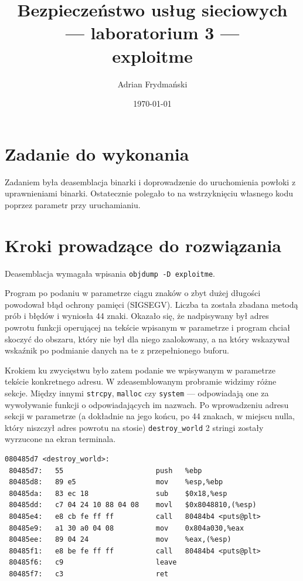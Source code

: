 \documentclass[a4paper]{article}
\title{Bezpieczeństwo usług sieciowych \\ --- laboratorium 3 --- \\ exploitme}
\author{Adrian Frydmański}
\date{\today}
\begin{document}
\maketitle

\section{Zadanie do wykonania}
Zadaniem była deasemblacja binarki i doprowadzenie do uruchomienia powłoki z uprawnieniami binarki. Ostatecznie polegało to na wstrzyknięciu własnego kodu poprzez parametr przy uruchamianiu.

\section{Kroki prowadzące do rozwiązania}
Deasemblacja wymagała wpisania \texttt{objdump -D exploitme}.

Program po podaniu w parametrze ciągu znaków o zbyt dużej długości powodował błąd ochrony pamięci (SIGSEGV). Liczba ta została zbadana metodą prób i błędów i wyniosła 44 znaki. Okazało się, że nadpisywany był adres powrotu funkcji operującej na tekście wpisanym w parametrze i program chciał skoczyć do obszaru, który nie był dla niego zaalokowany, a na który wskazywał wskaźnik po podmianie danych na te z przepełnionego buforu.

Krokiem ku zwycięstwu było zatem podanie we wpisywanym w parametrze tekście konkretnego adresu. W zdeasemblowanym probramie widzimy różne sekcje. Między innymi \texttt{strcpy}, \texttt{malloc} czy \texttt{system} --- odpowiadają one za wywoływanie funkcji o odpowiadających im nazwach. Po wprowadzeniu adresu sekcji w parametrze (a dokładnie na jego końcu, po 44 znakach, w miejscu nulla, który niszczył adres powrotu na stosie) \texttt{destroy\_world} 2 stringi zostały wyrzucone na ekran terminala.

\begin{lstlisting}
080485d7 <destroy_world>:
 80485d7:	55                   	push   %ebp
 80485d8:	89 e5                	mov    %esp,%ebp
 80485da:	83 ec 18             	sub    $0x18,%esp
 80485dd:	c7 04 24 10 88 04 08 	movl   $0x8048810,(%esp)
 80485e4:	e8 cb fe ff ff       	call   80484b4 <puts@plt>
 80485e9:	a1 30 a0 04 08       	mov    0x804a030,%eax
 80485ee:	89 04 24             	mov    %eax,(%esp)
 80485f1:	e8 be fe ff ff       	call   80484b4 <puts@plt>
 80485f6:	c9                   	leave  
 80485f7:	c3                   	ret     
\end{lstlisting}
\end{document}
